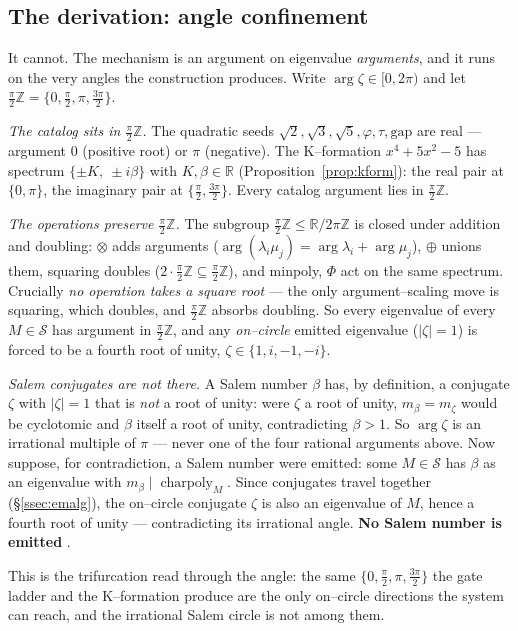 \documentclass[11pt]{article}
\theoremstyle{plain}
\theoremstyle{definition}
\theoremstyle{remark}
\newcommand{\R}{\mathbb{R}}
\newcommand{\Z}{\mathbb{Z}}
\newcommand{\abs}[1]{\left\lvert #1 \right\rvert}
\newcommand{\Scal}{\mathcal{S}}
\begin{document}
\subsection{The derivation: angle confinement}\label{ssec:angle}

It cannot. The mechanism is an argument on eigenvalue \emph{arguments}, and it runs on the very angles the construction produces. Write $\arg\zeta\in[0,2\pi)$ and let $\tfrac\pi2\Z=\{0,\tfrac\pi2,\pi,\tfrac{3\pi}2\}$.

\emph{The catalog sits in $\tfrac\pi2\Z$.} The quadratic seeds $\sqrt2,\sqrt3,\sqrt5,\varphi,\tau,\mathrm{gap}$ are real --- argument $0$ (positive root) or $\pi$ (negative). The K--formation $x^4+5x^2-5$ has spectrum $\{\pm K,\ \pm i\beta\}$ with $K,\beta\in\R$ (Proposition~\ref{prop:kform}): the real pair at $\{0,\pi\}$, the imaginary pair at $\{\tfrac\pi2,\tfrac{3\pi}2\}$. Every catalog argument lies in $\tfrac\pi2\Z$.

\emph{The operations preserve $\tfrac\pi2\Z$.} The subgroup $\tfrac\pi2\Z\le\R/2\pi\Z$ is closed under addition and doubling: $\otimes$ adds arguments ($\arg(\lambda_i\mu_j)=\arg\lambda_i+\arg\mu_j$), $\oplus$ unions them, squaring doubles ($2\cdot\tfrac\pi2\Z\subseteq\tfrac\pi2\Z$), and minpoly, $\Phi$ act on the same spectrum. Crucially \emph{no operation takes a square root} --- the only argument--scaling move is squaring, which doubles, and $\tfrac\pi2\Z$ absorbs doubling. So every eigenvalue of every $M\in\Scal$ has argument in $\tfrac\pi2\Z$, and any \emph{on--circle} emitted eigenvalue ($\abs\zeta=1$) is forced to be a fourth root of unity, $\zeta\in\{1,i,-1,-i\}$.

\emph{Salem conjugates are not there.} A Salem number $\beta$ has, by definition, a conjugate $\zeta$ with $\abs\zeta=1$ that is \emph{not} a root of unity: were $\zeta$ a root of unity, $m_\beta=m_\zeta$ would be cyclotomic and $\beta$ itself a root of unity, contradicting $\beta>1$. So $\arg\zeta$ is an irrational multiple of $\pi$ --- never one of the four rational arguments above. Now suppose, for contradiction, a Salem number were emitted: some $M\in\Scal$ has $\beta$ as an eigenvalue with $m_\beta\mid\operatorname{charpoly}_M$. Since conjugates travel together (\S\ref{ssec:emalg}), the on--circle conjugate $\zeta$ is also an eigenvalue of $M$, hence a fourth root of unity --- contradicting its irrational angle. \textbf{No Salem number is emitted} \cite[Thm 3.2]{EG}.

This is the trifurcation read through the angle: the same $\{0,\tfrac\pi2,\pi,\tfrac{3\pi}2\}$ the gate ladder and the K--formation produce are the only on--circle directions the system can reach, and the irrational Salem circle is not among them.
\end{document}
